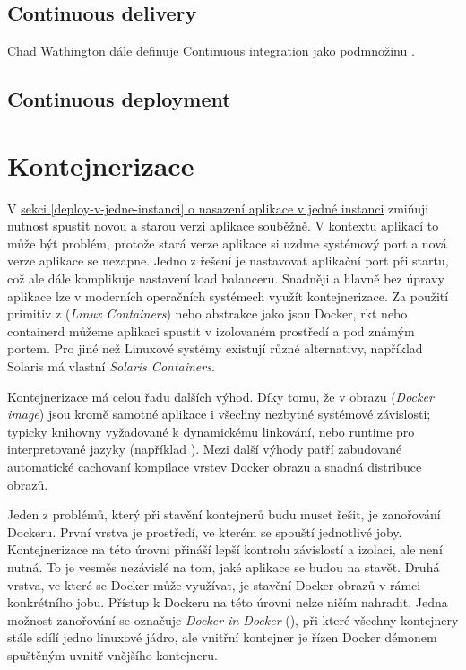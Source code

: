        \subsection{Continuous delivery}
            Chad Wathington dále definuje Continuous integration jako podmnožinu \CD \cite{fowler-go}.
            \blind[2]

        \subsection{Continuous deployment}
            \blind[2]

    \section{Kontejnerizace}
        V \hyperref[deploy-v-jedne-instanci]{sekci \ref*{deploy-v-jedne-instanci} o nasazení aplikace v jedné instanci} zmiňuji nutnost spustit novou a starou verzi aplikace souběžně. V kontextu \HTTP aplikací to může být problém, protože stará verze aplikace si uzdme systémový port a nová verze aplikace se nezapne. Jedno z řešení je nastavovat aplikační port při startu, což ale dále komplikuje nastavení load balanceru. Snadněji a hlavně bez úpravy aplikace lze v moderních operačních systémech využít kontejnerizace. Za použití primitiv z  (\textit{Linux Containers}) nebo abstrakce jako jsou Docker, rkt nebo containerd můžeme aplikaci spustit v izolovaném prostředí a pod známým portem. Pro jiné než Linuxové systémy existují různé alternativy, například Solaris má vlastní \textit{Solaris Containers}.

        Kontejnerizace má celou řadu dalších výhod. Díky tomu, že v obrazu (\textit{Docker image}) jsou kromě samotné aplikace i všechny nezbytné systémové závislosti; typicky knihovny vyžadované k dynamickému linkování, nebo runtime pro interpretované jazyky (například ). Mezi další výhody patří zabudované automatické cachovaní kompilace vrstev Docker obrazu a snadná distribuce obrazů.

        Jeden z problémů, který při stavění kontejnerů budu muset řešit, je zanořování Dockeru. První vrstva je prostředí, ve kterém se spouští jednotlivé \CI joby. Kontejnerizace na této úrovni přináší lepší kontrolu závislostí a izolaci, ale není nutná. To je vesměs nezávislé na tom, jaké aplikace se budou na \CI stavět. Druhá vrstva, ve které se Docker může využívat, je stavění Docker obrazů v rámci konkrétního \CI jobu. Přístup k Dockeru na této úrovni nelze ničím nahradit. Jedna možnost zanořování se označuje \textit{Docker in Docker} (), při které všechny kontejnery stále sdílí jedno linuxové jádro, ale vnitřní kontejner je řízen Docker démonem spuštěným uvnitř vnějšího kontejneru.

